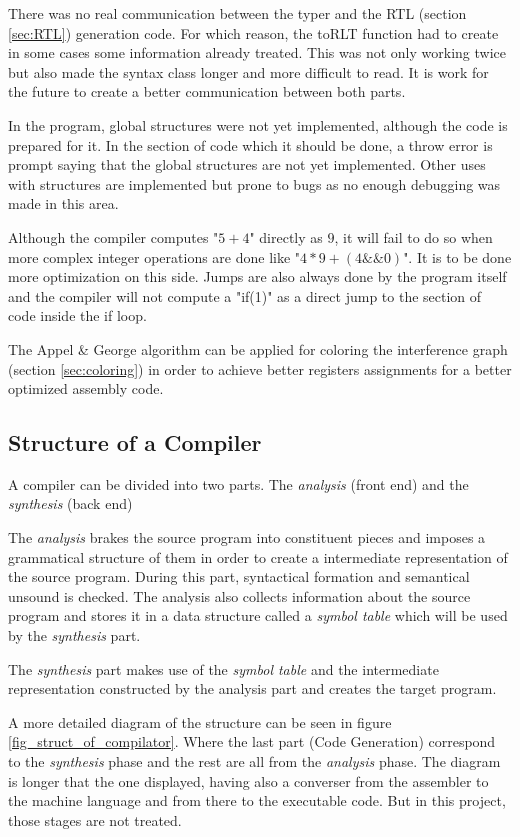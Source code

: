 \documentclass[conference]{IEEEtran}
\theoremstyle{definition}
\begin{document}
There was no real communication between the typer and the RTL (section \ref{sec:RTL}) generation code. For which reason, the toRLT function had to create in some cases some information already treated. This was not only working twice but also made the syntax class longer and more difficult to read. It is work for the future to create a better communication between both parts.

In the program, global structures were not yet implemented, although the code is prepared for it. In the section of code which it should be done, a throw error is prompt saying that the global structures are not yet implemented. Other uses with structures are implemented but prone to bugs as no enough debugging was made in this area. 

Although the compiler computes "$5 + 4$" directly as $9$, it will fail to do so when more complex integer operations are done like "$4 * 9 + (4 \&\& 0)$". It is to be done more optimization on this side. Jumps are also always done by the program itself and the compiler will not compute a "if(1)" as a direct jump to the section of code inside the if loop.

The Appel \& George algorithm can be applied for coloring the interference graph (section \ref{sec:coloring}) in order to achieve better registers assignments for a better optimized assembly code.

\subsection{Structure of a Compiler}\label{sub_structure_of_a_compiler}

A compiler can be divided into two parts. The \textit{analysis} (front end) and the \textit{synthesis} (back end)

The \textit{analysis} brakes the source program into constituent pieces and imposes a grammatical structure of them in order to create a intermediate representation of the source program. During this part, syntactical formation and semantical unsound is checked. The analysis also collects information about the source program and stores it in a data structure called a \textit{symbol table} which will be used by the \textit{synthesis} part.

The \textit{synthesis} part makes use of the \textit{symbol table} and the intermediate representation constructed by the analysis part and creates the target program.

A more detailed diagram of the structure can be seen in figure \ref{fig_struct_of_compilator}. Where the last part (Code Generation) correspond to the \textit{synthesis} phase and the rest are all from the \textit{analysis} phase. The diagram is longer that the one displayed, having also a converser from the assembler to the machine language and from there to the executable code. But in this project, those stages are not treated.
\end{document}
